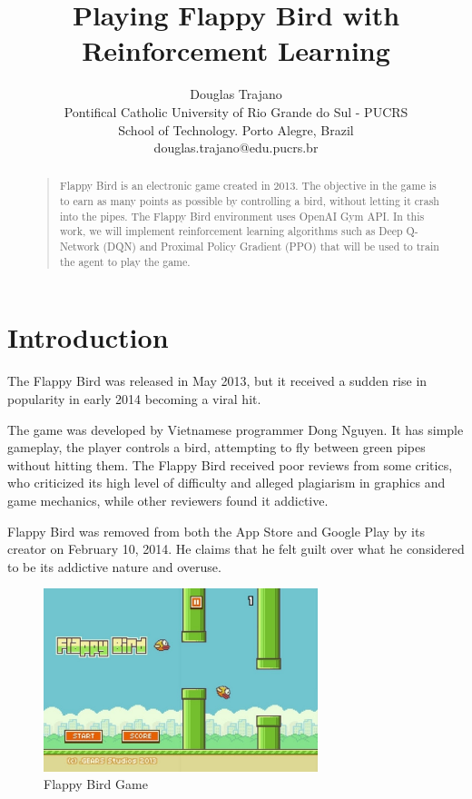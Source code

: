 \documentclass[letterpaper]{article}
\begin{document}
\title{Playing Flappy Bird with Reinforcement Learning}
\author{Douglas Trajano\\
Pontifical Catholic University of Rio Grande do Sul - PUCRS\\
School of Technology. Porto Alegre, Brazil\\
douglas.trajano@edu.pucrs.br
}
\maketitle
\begin{abstract}
\begin{quote}
Flappy Bird is an electronic game created in 2013. The objective in the game is to earn as many points as possible by controlling a bird, without letting it crash into the pipes. The Flappy Bird environment uses OpenAI Gym API. In this work, we will implement reinforcement learning algorithms such as Deep Q-Network (DQN) and Proximal Policy Gradient (PPO) that will be used to train the agent to play the game.
\end{quote}
\end{abstract}

\section{Introduction}

The Flappy Bird was released in May 2013, but it received a sudden rise in popularity in early 2014 becoming a viral hit.

The game was developed by Vietnamese programmer Dong Nguyen. It has simple gameplay, the player controls a bird, attempting to fly between green pipes without hitting them. The Flappy Bird received poor reviews from some critics, who criticized its high level of difficulty and alleged plagiarism in graphics and game mechanics, while other reviewers found it addictive.

Flappy Bird was removed from both the App Store and Google Play by its creator on February 10, 2014. He claims that he felt guilt over what he considered to be its addictive nature and overuse.

\begin{figure}[ht]
    \centering
    \includegraphics[width=8cm]{images/flappy-bird.jpeg}
    \caption{Flappy Bird Game}
    \label{fig:flappy-bird-game}
\end{figure}
\end{document}
